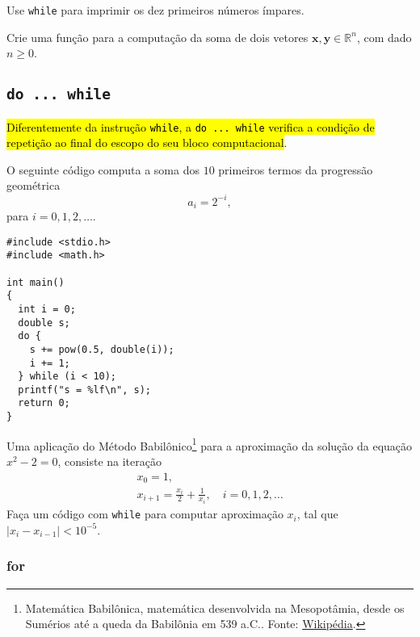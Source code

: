 \documentclass[12pt]{article}
\begin{document}
\begin{exr}
  Use \lstinline+while+ para imprimir os dez primeiros números ímpares.
\end{exr}

\begin{exr}
  Crie uma função para a computação da soma de dois vetores $\pmb{x}, \pmb{y}\in\mathbb{R}^n$, com dado $n\geq 0$.
\end{exr}

\subsection{\lstinline+do ... while+}

\hl{Diferentemente da instrução {\lstinline!while!}, a {\lstinline!do ... while!} verifica a condição de repetição ao final do escopo do seu bloco computacional}.

\begin{ex}
  O seguinte código computa a soma dos $10$ primeiros termos da progressão geométrica
  \begin{equation}
    a_i = 2^{-i},
  \end{equation}
  para $i = 0, 1, 2, \ldots$.

\begin{lstlisting}[caption=doWhile.cc]
#include <stdio.h>
#include <math.h>

int main()
{
  int i = 0;
  double s;
  do {
    s += pow(0.5, double(i));
    i += 1;
  } while (i < 10);
  printf("s = %lf\n", s);
  return 0;
}
\end{lstlisting}  
\end{ex}

\begin{exr}
  Uma aplicação do Método Babilônico\footnote{Matemática Babilônica, matemática desenvolvida na Mesopotâmia, desde os Sumérios até a queda da Babilônia em 539 a.C.. Fonte: \href{https://pt.wikipedia.org/wiki/Matem\%C3\%A1tica\_babil\%C3\%B4nica}{Wikipédia}.} para a aproximação da solução da equação $x^2-2 = 0$, consiste na iteração
  \begin{gather}
    x_0 = 1,\\
    x_{i+1} = \frac{x_i}{2} + \frac{1}{x_i},\quad i=0,1,2,\ldots
  \end{gather}
  Faça um código com \lstinline+while+ para computar aproximação $x_{i}$, tal que $|x_{i}-x_{i-1}|<10^{-5}$.
\end{exr}

\subsubsection{for}
\end{document}
